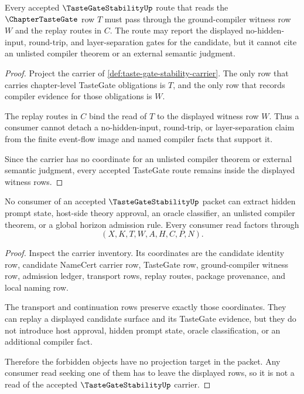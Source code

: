 \begin{theorem}
\label{thm:taste-gate-stability-ground-compiler-witness-route}
Every accepted $\TasteGateStabilityUp$ route that reads the $\ChapterTasteGate$ row $T$ must pass through the ground-compiler witness row $W$ and the replay routes in $C$. The route may report the displayed no-hidden-input, round-trip, and layer-separation gates for the candidate, but it cannot cite an unlisted compiler theorem or an external semantic judgment.
\end{theorem}
\begin{proof}
Project the carrier of \autoref{def:taste-gate-stability-carrier}. The only row that carries chapter-level TasteGate obligations is $T$, and the only row that records compiler evidence for those obligations is $W$.

The replay routes in $C$ bind the read of $T$ to the displayed witness row $W$. Thus a consumer cannot detach a no-hidden-input, round-trip, or layer-separation claim from the finite event-flow image and named compiler facts that support it.

Since the carrier has no coordinate for an unlisted compiler theorem or external semantic judgment, every accepted TasteGate route remains inside the displayed witness rows.
\end{proof}

\begin{theorem}
\label{thm:taste-gate-stability-non-escape-boundary}
No consumer of an accepted $\TasteGateStabilityUp$ packet can extract hidden prompt state, host-side theory approval, an oracle classifier, an unlisted compiler theorem, or a global horizon admission rule. Every consumer read factors through
$$
(X,K,T,W,A,H,C,P,N).
$$
\end{theorem}
\begin{proof}
Inspect the carrier inventory. Its coordinates are the candidate identity row, candidate NameCert carrier row, TasteGate row, ground-compiler witness row, admission ledger, transport rows, replay routes, package provenance, and local naming row.

The transport and continuation rows preserve exactly those coordinates. They can replay a displayed candidate surface and its TasteGate evidence, but they do not introduce host approval, hidden prompt state, oracle classification, or an additional compiler fact.

Therefore the forbidden objects have no projection target in the packet. Any consumer read seeking one of them has to leave the displayed rows, so it is not a read of the accepted $\TasteGateStabilityUp$ carrier.
\end{proof}

